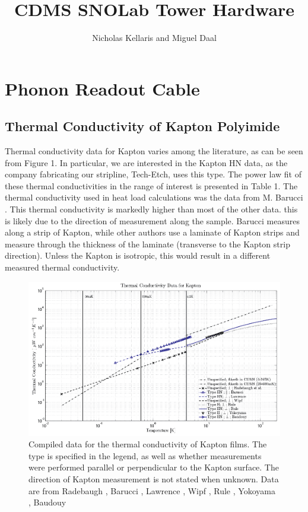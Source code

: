 \documentclass{article}
\title{CDMS SNOLab Tower Hardware}
\author{Nicholas Kellaris and Miguel Daal}
\begin{document}

\maketitle

\section{Phonon Readout Cable}

\subsection{Thermal Conductivity of Kapton Polyimide}

Thermal conductivity data for Kapton varies among the literature, as can be seen from Figure 1. In particular, we are interested in the Kapton HN data, as the company fabricating our stripline, Tech-Etch, uses this type. The power law fit of these thermal conductivities in the range of interest is presented in Table 1. The thermal conductivity used in heat load calculations was the data from M. Barucci \cite{bar}. This thermal conductivity is markedly higher than most of the other data. this is likely due to the direction of measurement along the sample. Barucci measures along a strip of Kapton, while other authors use a laminate of Kapton strips and measure through the thickness of the laminate (transverse to the Kapton strip direction). Unless the Kapton is isotropic, this would result in a different measured thermal conductivity.

\begin{figure}[h]
\includegraphics[width = .9\textwidth]{Kapton_var.png}
\caption{Compiled data for the thermal conductivity of Kapton films. The type is specified in the legend, as well as whether measurements were performed parallel or perpendicular to the Kapton surface. The direction of Kapton measurement is not stated when unknown. Data are from Radebaugh \cite{rad73}, Barucci \cite{bar}, Lawrence \cite{law}, Wipf \cite{wip}, Rule \cite{Rule1996}, Yokoyama \cite{yok}, Baudouy \cite{Baudouy2003} }
\end{figure}
\end{document}
